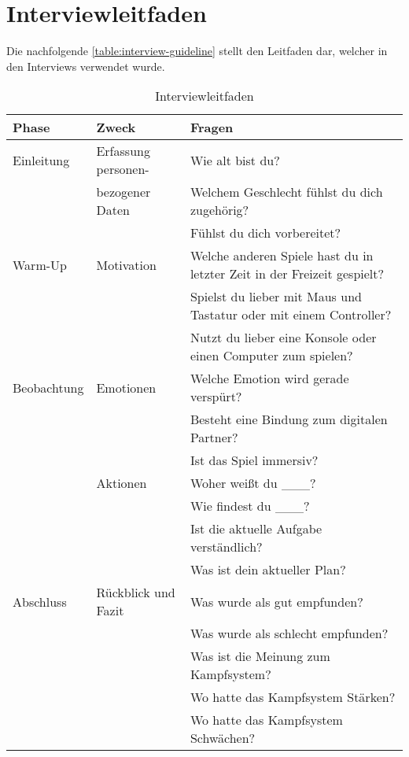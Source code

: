 \section{Interviewleitfaden}
Die nachfolgende \autoref{table:interview-guideline} stellt den Leitfaden dar, welcher in den Interviews verwendet wurde.
\begin{table}[h]
	\begin{center}
		\begin{tabularx}{\textwidth}{l|l|X}
			\textbf{Phase} & \textbf{Zweck} & \textbf{Fragen} \\
			\hline
			Einleitung & Erfassung personen- & Wie alt bist du? \\
            & bezogener Daten & Welchem Geschlecht fühlst du dich zugehörig? \\
            & & Fühlst du dich vorbereitet? 
            \newline \\
			Warm-Up    & Motivation & Welche anderen Spiele hast du in letzter Zeit in der Freizeit gespielt? \\
			& & Spielst du lieber mit Maus und Tastatur oder mit einem Controller? \\
			& & Nutzt du lieber eine Konsole oder einen Computer zum spielen?
			\newline \\
			Beobachtung & Emotionen & Welche Emotion wird gerade verspürt? \\
			& & Besteht eine Bindung zum digitalen Partner? \\
			& & Ist das Spiel immersiv? \newline \\
			& Aktionen & Woher weißt du \_\_\_? \\
			& & Wie findest du \_\_\_? \\
			& & Ist die aktuelle Aufgabe verständlich? \\
			& & Was ist dein aktueller Plan?
			\newline \\
			Abschluss & Rückblick und Fazit & Was wurde als gut empfunden? \\
			& & Was wurde als schlecht empfunden? \\
			& & Was ist die Meinung zum Kampfsystem? \\
			& & Wo hatte das Kampfsystem Stärken? \\
			& & Wo hatte das Kampfsystem Schwächen?
		\end{tabularx}
	\caption{Interviewleitfaden}
	\label{table:interview-guideline}
	\end{center}
\end{table}

